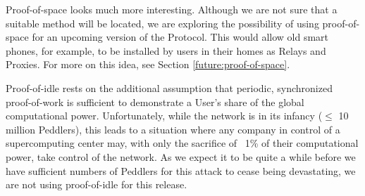 Proof-of-space looks much more interesting. Although we are not sure that a suitable method will be located, we are exploring the possibility of using proof-of-space for an upcoming version of the \Orchid{} Protocol. This would allow old smart phones, for example, to be installed by users in their homes as Relays and Proxies. For more on this idea, see Section \ref{future:proof-of-space}.

Proof-of-idle rests on the additional assumption that periodic, synchronized proof-of-work is sufficient to demonstrate a User’s share of the global computational power. Unfortunately, while the network is in its infancy ($\leq$ 10 million Peddlers), this leads to a situation where any company in control of a supercomputing center may, with only the sacrifice of ~1\% of their computational power, take control of the network. As we expect it to be quite a while before we have sufficient numbers of Peddlers for this attack to cease being devastating, we are not using proof-of-idle for this release.

